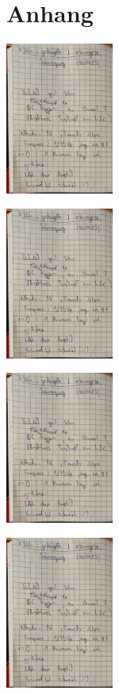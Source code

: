 \section*{Anhang}

\begin{minipage}[t]{0.4\textwidth}
    \includegraphics[height=5cm, page=1]{Inhalte/v354_messdaten.pdf}
\end{minipage}
\begin{minipage}[t]{0.4\textwidth}
    \includegraphics[height=5cm, keepaspectratio, page=2]{Inhalte/v354_messdaten.pdf}
\end{minipage}

\begin{minipage}[t]{0.4\textwidth}
    \includegraphics[height=5cm, page=3]{Inhalte/v354_messdaten.pdf}
\end{minipage}
\begin{minipage}[t]{0.4\textwidth}
    \includegraphics[height=5cm, page=4]{Inhalte/v354_messdaten.pdf}
\end{minipage}

